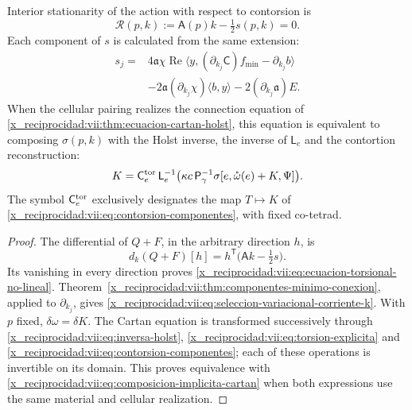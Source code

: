 \begin{proposition}
\label{x_reciprocidad:vii:prop:ecuacion-torsional-no-lineal}
Interior stationarity of the action with respect to contorsion is
\begin{equation}
 \mathcal R(p,k):=\mathsf A(p)k-\tfrac12s(p,k)=0.
 \label{x_reciprocidad:vii:eq:ecuacion-torsional-no-lineal}
\end{equation}
Each component of \(s\) is calculated from the same extension:
\begin{equation}
 \begin{split}
 s_j={}&4\mathfrak a\chi\operatorname{Re}
       \langle y,(\partial_{k_j}\mathsf C)f_{\min}
                         -\partial_{k_j}b\rangle\\
 &-2\mathfrak a(\partial_{k_j}\chi)\langle b,y\rangle
       -2(\partial_{k_j}\mathfrak a)E.
 \end{split}
 \label{x_reciprocidad:vii:eq:seleccion-variacional-corriente-k}
\end{equation}
When the cellular pairing realizes the connection equation of
\ref{x_reciprocidad:vii:thm:ecuacion-cartan-holst}, this equation is equivalent to composing
\(\sigma(p,k)\) with the Holst inverse, the inverse of
\(\mathsf L_e\) and the contortion reconstruction:
\begin{equation}
 K=\mathsf C_e^{\rm tor}\,\mathsf L_e^{-1}
           \bigl(\kappa c\,\mathsf P_\gamma^{-1}
             \sigma[e,\mathring\omega(e)+K,\Psi]\bigr).
 \label{x_reciprocidad:vii:eq:composicion-implicita-cartan}
\end{equation}
The symbol \(\mathsf C_e^{\rm tor}\) exclusively designates the
map \(T\mapsto K\) of
\eqref{x_reciprocidad:vii:eq:contorsion-componentes}, with fixed co-tetrad.
\end{proposition}

\begin{proof}
The differential of \(Q+F\), in the arbitrary direction \(h\), is
\[
 d_k(Q+F)[h]
   =h^{\mathsf T}\bigl(\mathsf A k-\tfrac12s\bigr).
\]
Its vanishing in every direction proves
\eqref{x_reciprocidad:vii:eq:ecuacion-torsional-no-lineal}.
Theorem~\ref{x_reciprocidad:vii:thm:componentes-minimo-conexion}, applied to
\(\partial_{k_j}\), gives
\eqref{x_reciprocidad:vii:eq:seleccion-variacional-corriente-k}. With \(p\) fixed,
\(\delta\omega=\delta K\). The Cartan equation is transformed
successively through \eqref{x_reciprocidad:vii:eq:inversa-holst},
\eqref{x_reciprocidad:vii:eq:torsion-explicita} and
\eqref{x_reciprocidad:vii:eq:contorsion-componentes}; each of these operations
is invertible on its domain. This proves equivalence with
\eqref{x_reciprocidad:vii:eq:composicion-implicita-cartan} when both expressions
use the same material and cellular realization.
\end{proof}

